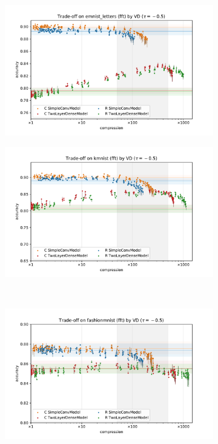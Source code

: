 \documentclass[a4paper,10pt]{article}
\begin{document}
\begin{figure}[b]
  \centering
  \begin{subfigure}[b]{0.5\textwidth}
    \centering
    \includegraphics[width=\linewidth]{figure__mnist-like__trade-off/legacy__VD__emnist_letters__fft__-0.5.pdf}
  \end{subfigure}%
  \begin{subfigure}[b]{0.5\textwidth}
    \centering
    \includegraphics[width=\linewidth]{figure__mnist-like__trade-off/legacy__VD__kmnist__fft__-0.5.pdf}
  \end{subfigure} \\%
  \begin{subfigure}[b]{0.5\textwidth}
    \centering
    \includegraphics[width=\linewidth]{figure__mnist-like__trade-off/legacy__VD__fashionmnist__fft__-0.5.pdf}

\end{subfigure}
\end{figure}
\end{document}
